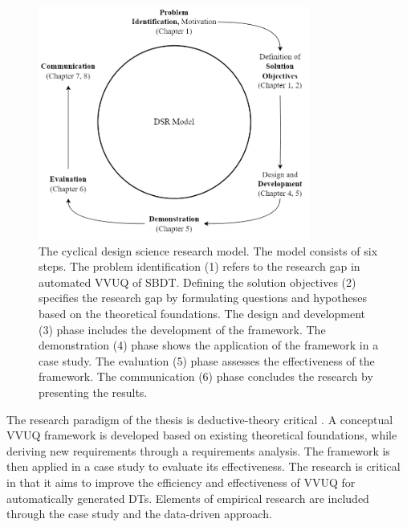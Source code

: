 \begin{figure}[H]
  \centering
  \includegraphics[width=0.8\textwidth]{figures/dsr.png}
  \caption{The cyclical design science research model. The model consists of six steps. The problem identification (1) refers to the research gap in automated VVUQ of SBDT. Defining the solution objectives (2) specifies the research gap by formulating questions and hypotheses based on the theoretical foundations. The design and development (3) phase includes the development of the framework. The demonstration (4) phase shows the application of the framework in a case study. The evaluation (5) phase assesses the effectiveness of the framework. The communication (6) phase concludes the research by presenting the results.}
  \label{fig:DSR}
\end{figure}

The research paradigm of the thesis is deductive-theory critical \autocite{eberhard1987einfuhrung}. A conceptual VVUQ framework is developed based on existing theoretical foundations, while deriving new requirements through a requirements analysis. The framework is then applied in a case study to evaluate its effectiveness. The research is critical in that it aims to improve the efficiency and effectiveness of VVUQ for automatically generated DTs. Elements of empirical research are included through the case study and the data-driven approach.

